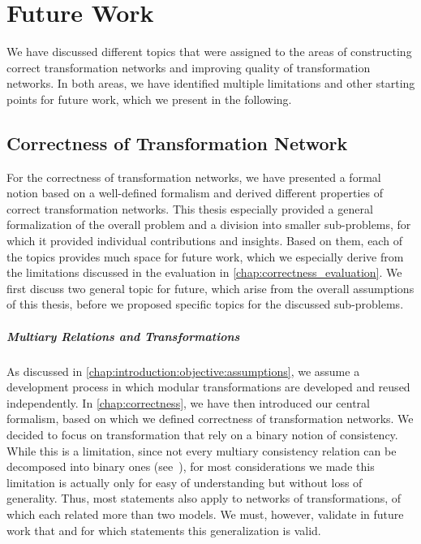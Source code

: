 \chapter{Future Work
}
\label{chap:futurework}

We have discussed different topics that were assigned to the areas of constructing correct transformation networks and improving quality of transformation networks.
In both areas, we have identified multiple limitations and other starting points for future work, which we present in the following.


\section{Correctness of Transformation Network}

For the correctness of transformation networks, we have presented a formal notion based on a well-defined formalism and derived different properties of correct transformation networks.
This thesis especially provided a general formalization of the overall problem and a division into smaller sub-problems, for which it provided individual contributions and insights.
Based on them, each of the topics provides much space for future work, which we especially derive from the limitations discussed in the evaluation in \autoref{chap:correctness_evaluation}.
We first discuss two general topic for future, which arise from the overall assumptions of this thesis, before we proposed specific topics for the discussed sub-problems.

\paragraph{Multiary Relations and Transformations}
\label{chap:futurework:correctness:multiary}
As discussed in \autoref{chap:introduction:objective:assumptions}, we assume a development process in which modular transformations are developed and reused independently.
In \autoref{chap:correctness}, we have then introduced our central formalism, based on which we defined correctness of transformation networks.
We decided to focus on transformation that rely on a binary notion of consistency.
While this is a limitation, since not every multiary consistency relation can be decomposed into binary ones (see~\cite{stevens2020BidirectionalTransformationLarge-SoSym}), for most considerations we made this limitation is actually only for easy of understanding but without loss of generality.
Thus, most statements also apply to networks of transformations, of which each related more than two models.
We must, however, validate in future work that and for which statements this generalization is valid.

